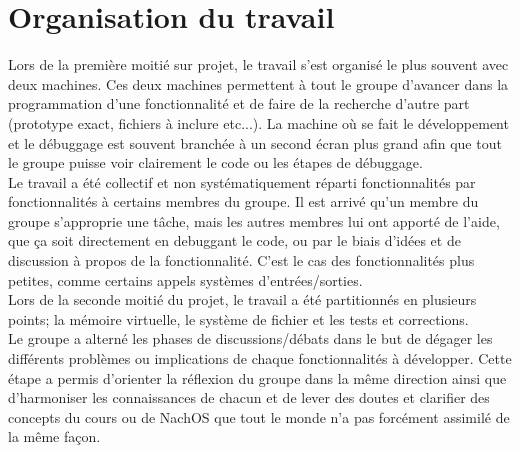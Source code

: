 \documentclass{report}
\begin{document}
\section*{Organisation du travail}
Lors de la première moitié sur projet, le travail s'est organisé le plus souvent avec deux machines. Ces deux machines permettent à tout le groupe d'avancer dans la programmation d'une fonctionnalité et de faire de la recherche d'autre part (prototype exact, fichiers à inclure etc...). La machine où se fait le développement et le débuggage est souvent branchée à un second écran plus grand afin que tout le groupe puisse voir clairement le code ou les étapes de débuggage.\\
Le travail a été collectif et non systématiquement réparti fonctionnalités par fonctionnalités à certains membres du groupe. Il est arrivé qu'un membre du groupe s'approprie une tâche, mais les autres membres lui ont apporté de l'aide, que ça soit directement en debuggant le code, ou par le biais d'idées et de discussion à propos de la fonctionnalité. C'est le cas des fonctionnalités plus petites, comme certains appels systèmes d'entrées/sorties.\\

Lors de la seconde moitié du projet, le travail a été partitionnés en plusieurs points; la mémoire virtuelle, le système de fichier et les tests et corrections.\\


Le groupe a alterné les phases de discussions/débats dans le but de dégager les différents problèmes ou implications de chaque fonctionnalités à développer. Cette étape a permis d'orienter la réflexion du groupe dans la même direction ainsi que d'harmoniser les connaissances de chacun et de lever des doutes et clarifier des concepts du cours ou de NachOS que tout le monde n'a pas forcément assimilé de la même façon.\\
\end{document}
